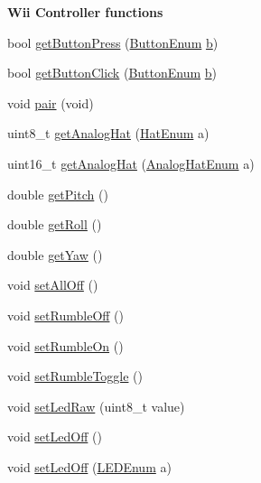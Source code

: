 \begin{Indent}{\bf \-Wii \-Controller functions}\par
\begin{DoxyCompactItemize}
\item 
bool \hyperlink{class_w_i_i_a7b183fe1809c1c595438e930b8f3f4de}{get\-Button\-Press} (\hyperlink{controller_enums_8h_a94f7389d205c78830a5441370d7870fd}{\-Button\-Enum} \hyperlink{_p_s4_parser_8h_a4313c9563516f94387762ab05763456b}{b})
\item 
bool \hyperlink{class_w_i_i_ac94e8b9ce6d3f914f0e3ee4fba82efa3}{get\-Button\-Click} (\hyperlink{controller_enums_8h_a94f7389d205c78830a5441370d7870fd}{\-Button\-Enum} \hyperlink{_p_s4_parser_8h_a4313c9563516f94387762ab05763456b}{b})
\item 
void \hyperlink{class_w_i_i_a39c3101b26cc549d5258018b3d05c608}{pair} (void)
\item 
uint8\-\_\-t \hyperlink{class_w_i_i_a8e34abf62a9631ca3efba0150ca91b93}{get\-Analog\-Hat} (\hyperlink{_wii_8h_ad79e49e27b025d6ac9d695c4816f84d4}{\-Hat\-Enum} a)
\item 
uint16\-\_\-t \hyperlink{class_w_i_i_a9f88f608bd002270797dd3bc25900f1e}{get\-Analog\-Hat} (\hyperlink{controller_enums_8h_a34dad8f0a0927471137c403216597093}{\-Analog\-Hat\-Enum} a)
\item 
double \hyperlink{class_w_i_i_a748172bd57804856594ea8e21601319e}{get\-Pitch} ()
\item 
double \hyperlink{class_w_i_i_a6ac037d884f97319892e8671ef070c03}{get\-Roll} ()
\item 
double \hyperlink{class_w_i_i_ae92e129c54c8131f4a2c55582dfd2f11}{get\-Yaw} ()
\item 
void \hyperlink{class_w_i_i_a6e97bfcfb134b63d7190ba1bc326e1d3}{set\-All\-Off} ()
\item 
void \hyperlink{class_w_i_i_a2c5c32841b020b248f757cb793acb936}{set\-Rumble\-Off} ()
\item 
void \hyperlink{class_w_i_i_a0d9c869bd3677c4488a586c38558a137}{set\-Rumble\-On} ()
\item 
void \hyperlink{class_w_i_i_a841396b533cccccb05db37d35f6fef9c}{set\-Rumble\-Toggle} ()
\item 
void \hyperlink{class_w_i_i_ae7e07f929fba8f0ff061a1405baa2b58}{set\-Led\-Raw} (uint8\-\_\-t value)
\item 
void \hyperlink{class_w_i_i_ae3eb7942181a9c9e681e18bd5c8eaef4}{set\-Led\-Off} ()
\item 
void \hyperlink{class_w_i_i_a60e552c026ac99f2c74b9c3eb9c3a7c9}{set\-Led\-Off} (\hyperlink{controller_enums_8h_a70df64e026046bc352983127b7ae2cf0}{\-L\-E\-D\-Enum} a)

\end{DoxyCompactItemize}
\end{Indent}
